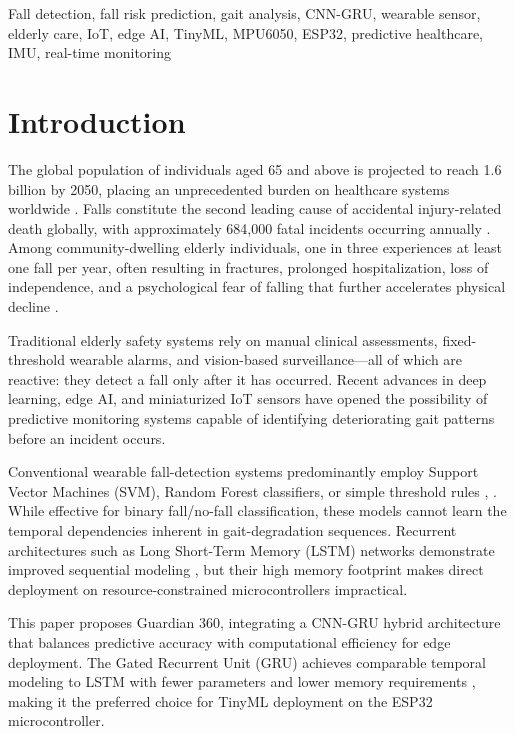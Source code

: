 \documentclass[conference]{IEEEtran}
\begin{document}
\begin{IEEEkeywords}
Fall detection, fall risk prediction, gait analysis, CNN-GRU, wearable sensor, elderly care, IoT, edge AI, TinyML, MPU6050, ESP32, predictive healthcare, IMU, real-time monitoring
\end{IEEEkeywords}

\section{Introduction}

The global population of individuals aged 65 and above is projected to reach 1.6 billion by 2050, placing an unprecedented burden on healthcare systems worldwide \cite{b1}. Falls constitute the second leading cause of accidental injury-related death globally, with approximately 684,000 fatal incidents occurring annually \cite{b2}. Among community-dwelling elderly individuals, one in three experiences at least one fall per year, often resulting in fractures, prolonged hospitalization, loss of independence, and a psychological fear of falling that further accelerates physical decline \cite{b3}.

Traditional elderly safety systems rely on manual clinical assessments, fixed-threshold wearable alarms, and vision-based surveillance---all of which are reactive: they detect a fall only after it has occurred. Recent advances in deep learning, edge AI, and miniaturized IoT sensors have opened the possibility of predictive monitoring systems capable of identifying deteriorating gait patterns before an incident occurs.

Conventional wearable fall-detection systems predominantly employ Support Vector Machines (SVM), Random Forest classifiers, or simple threshold rules \cite{b4}, \cite{b5}. While effective for binary fall/no-fall classification, these models cannot learn the temporal dependencies inherent in gait-degradation sequences. Recurrent architectures such as Long Short-Term Memory (LSTM) networks demonstrate improved sequential modeling \cite{b13}, but their high memory footprint makes direct deployment on resource-constrained microcontrollers impractical.

This paper proposes Guardian 360, integrating a CNN-GRU hybrid architecture that balances predictive accuracy with computational efficiency for edge deployment. The Gated Recurrent Unit (GRU) achieves comparable temporal modeling to LSTM with fewer parameters and lower memory requirements \cite{b6}, making it the preferred choice for TinyML deployment on the ESP32 microcontroller.
\end{document}
